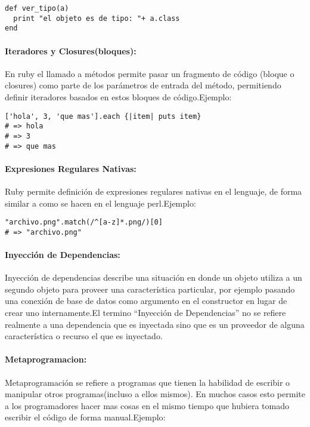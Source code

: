 \begin{verbatim}
def ver_tipo(a)
  print "el objeto es de tipo: "+ a.class
end
\end{verbatim}

\paragraph{Iteradores y Closures(bloques):}
En ruby el llamado a métodos permite pasar un fragmento de código (bloque o closures) como parte de los parámetros de entrada del método, permitiendo definir iteradores basados en estos bloques de código.\newline Ejemplo:

\begin{verbatim}
['hola', 3, 'que mas'].each {|item| puts item}
# => hola
# => 3
# => que mas
\end{verbatim}

\paragraph{Expresiones Regulares Nativas:}
Ruby permite definición de expresiones regulares nativas en el lenguaje, de forma similar a como se hacen en el lenguaje perl.\newline Ejemplo:

\begin{verbatim}
"archivo.png".match(/^[a-z]*.png/)[0]
# => "archivo.png"
\end{verbatim}

\paragraph{Inyección de Dependencias:}
Inyección de dependencias describe una situación en donde un objeto utiliza a un segundo objeto para proveer una característica particular, por ejemplo pasando una conexión de base de datos como argumento en el constructor en lugar de crear uno internamente.\newline El termino ``Inyección de Dependencias'' no se refiere realmente a una dependencia que es inyectada sino que es un proveedor de alguna característica o recurso el que es inyectado.

\paragraph{Metaprogramacion:}
Metaprogramación se refiere a programas que tienen la habilidad de escribir o manipular otros programas(incluso a ellos mismos). En muchos casos esto permite a los programadores hacer mas cosas en el mismo tiempo que hubiera tomado escribir el código de forma manual.\newline Ejemplo:

